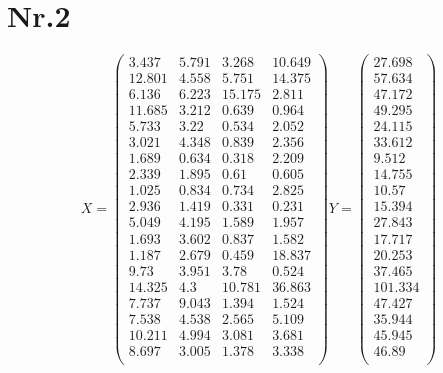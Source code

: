 \documentclass[a4paper,11pt,twoside]{scrartcl}
\begin{document}
\section*{Nr.2}
\[
X = \begin{pmatrix}
3.437 & 5.791 & 3.268 & 10.649 \\
12.801 & 4.558 & 5.751 & 14.375 \\
6.136 & 6.223 & 15.175 & 2.811 \\
11.685 & 3.212 & 0.639 & 0.964 \\
5.733 & 3.22 & 0.534 & 2.052 \\
3.021 & 4.348 & 0.839 & 2.356 \\
1.689 & 0.634 & 0.318 & 2.209 \\
2.339 & 1.895 & 0.61 & 0.605 \\
1.025 & 0.834 & 0.734 & 2.825 \\
2.936 & 1.419 & 0.331 & 0.231 \\
5.049 & 4.195 & 1.589 & 1.957 \\
1.693 & 3.602 & 0.837 & 1.582 \\
1.187 & 2.679 & 0.459 & 18.837 \\
9.73 & 3.951 & 3.78 & 0.524 \\
14.325 & 4.3 & 10.781 & 36.863 \\
7.737 & 9.043 & 1.394 & 1.524 \\
7.538 & 4.538 & 2.565 & 5.109 \\
10.211 & 4.994 & 3.081 & 3.681 \\
8.697 & 3.005 & 1.378 & 3.338 \\
\end{pmatrix}
%
Y = \begin{pmatrix}
27.698 \\
57.634 \\
47.172 \\
49.295 \\
24.115 \\
33.612 \\
9.512 \\
14.755 \\
10.57 \\
15.394 \\
27.843 \\
17.717 \\
20.253 \\
37.465 \\
101.334 \\
47.427 \\
35.944 \\
45.945 \\
46.89 \\
\end{pmatrix}
\]
\end{document}
